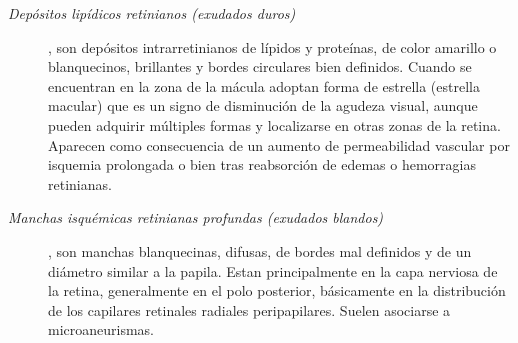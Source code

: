 \begin{description}
\begin{description}
\begin{description}
	\item[\normalfont\textit{Dep\'ositos lip\'idicos retinianos (exudados duros)}], son dep\'ositos intrarretinianos de l\'ipidos y prote\'inas, de color amarillo o blanquecinos, brillantes y bordes circulares bien definidos. Cuando se encuentran en la zona de la m\'acula adoptan forma de estrella (estrella macular) que es un signo de disminuci\'on de la agudeza visual, aunque pueden adquirir m\'ultiples formas y localizarse en otras zonas de la retina. Aparecen como consecuencia de un aumento de permeabilidad vascular por isquemia prolongada o bien tras reabsorci\'on de edemas o hemorragias retinianas. 
\item[\normalfont\textit{ Manchas isqu\'emicas retinianas profundas (exudados blandos)}], son manchas blanquecinas, difusas, de bordes mal definidos y de un di\'ametro similar a la papila. Estan principalmente en la capa nerviosa de la retina, generalmente en el polo posterior, b\'asicamente en la distribuci\'on de los capilares retinales radiales peripapilares. Suelen asociarse a microaneurismas.
\end{description}
\end{description}


\end{description}
